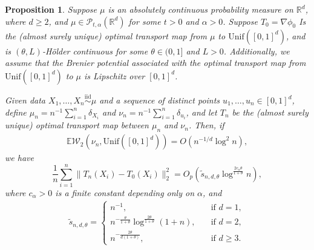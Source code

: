 \documentclass[11pt]{article}
\newtheorem{prop}[thm]{Proposition}
\begin{document}
\begin{prop}\label{prop:EmpiricalOTMapError_deterministic} 
Suppose $\mu$ is an absolutely continuous probability measure on $\mathbb{R}^d$, where $d \geq 2$, and $\mu\in \mathcal{P}_{t, \alpha}(\mathbb{R}^d)$ for some $t >0$ and $\alpha >0$. Suppose $T_0= \nabla \phi_0$ Is the (almost surely unique) optimal transport map from $\mu$ to $\mathrm{Unif}([0, 1]^d)$, and is $(\theta, L)$-H\"older continuous for some $\theta\in(0, 1]$ and $L > 0$. Additionally, we assume that the Brenier potential associated with the optimal transport map from $\mathrm{Unif}([0, 1]^d)$ to $\mu$ is Lipschitz over $[0, 1]^d$. 

Given data $X_1, \ldots, X_n \stackrel{\mathrm{iid}}{\sim} \mu$ and a sequence of distinct points $u_1, \ldots, u_n \in [0, 1]^d$, define ${\mu}_n= n^{-1} \sum_{i=1}^n \delta_{X_i}$ and $\nu_n = n^{-1} \sum_{i = 1}^n \delta_{u_i}$, and let $ T_n$ be the (almost surely unique) optimal transport map between $ \mu_n$ and $ \nu_n$. Then, if 
\begin{align*}
    \mathbb{E} \mathcal{W}_2( \nu_n, \mathrm{Unif}([0, 1]^d)) = O(n^{-1/d}\log^2 n),
\end{align*}
we have
\[
\frac{1}{n}\sum_{i = 1}^n \bigl\| T_n (X_i) - T_0(X_i)\bigr\|_2^2 = O_p(\tilde{s}_{n,d,\theta}\log^{\frac{2c_{ \alpha} \theta}{1 + \theta}} n),
\]
where $c_{\alpha} > 0$ is a finite constant depending only on $\alpha$, and
\begin{align*}
    \tilde s_{n, d, \theta} = \begin{cases}
        n^{-1}, \quad &\text{if $d = 1$}, \\
        n^{-\frac{\theta}{1+\theta}} \log^{\frac{2\theta}{1+\theta}} (1+n), \quad &\text{if $d = 2$}, \\
        n^{-\frac{2\theta}{d(1+\theta)}}, \quad &\text{if $d \geq 3$}.
    \end{cases}
\end{align*}
\end{prop}
\end{document}
